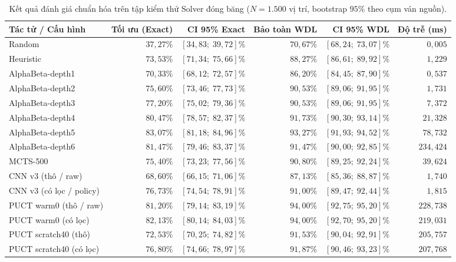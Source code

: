 \documentclass[11pt, a4paper]{article}
\begin{document}
\begin{table}[H]
    \centering
    \small
    \caption{Kết quả đánh giá chuẩn hóa trên tập kiểm thử Solver đóng băng ($N = 1.500$ vị trí, bootstrap $95\%$ theo cụm ván nguồn).}
    \label{tab:main_solver_eval}
    \begin{tabular}{@{} l r r r r r @{}}
        \toprule
        \textbf{Tác tử / Cấu hình} & \textbf{Tối ưu (Exact)} & \textbf{CI 95\% Exact} & \textbf{Bảo toàn WDL} & \textbf{CI 95\% WDL} & \textbf{Độ trễ (ms)} \\
        \midrule
        Random & $37{,}27\%$ & $[34{,}83;\; 39{,}72]\%$ & $70{,}67\%$ & $[68{,}24;\; 73{,}07]\%$ & $0{,}005$ \\
        Heuristic & $73{,}53\%$ & $[71{,}34;\; 75{,}66]\%$ & $88{,}27\%$ & $[86{,}61;\; 89{,}92]\%$ & $1{,}229$ \\
        AlphaBeta-depth1 & $70{,}33\%$ & $[68{,}12;\; 72{,}57]\%$ & $86{,}20\%$ & $[84{,}45;\; 87{,}90]\%$ & $0{,}537$ \\
        AlphaBeta-depth2 & $75{,}60\%$ & $[73{,}46;\; 77{,}73]\%$ & $90{,}53\%$ & $[89{,}06;\; 91{,}95]\%$ & $1{,}731$ \\
        AlphaBeta-depth3 & $77{,}20\%$ & $[75{,}02;\; 79{,}36]\%$ & $90{,}53\%$ & $[89{,}06;\; 91{,}95]\%$ & $7{,}372$ \\
        AlphaBeta-depth4 & $80{,}47\%$ & $[78{,}57;\; 82{,}37]\%$ & $91{,}73\%$ & $[90{,}30;\; 93{,}14]\%$ & $21{,}328$ \\
        AlphaBeta-depth5 & $83{,}07\%$ & $[81{,}18;\; 84{,}96]\%$ & $93{,}27\%$ & $[91{,}93;\; 94{,}52]\%$ & $78{,}732$ \\
        AlphaBeta-depth6 & $81{,}47\%$ & $[79{,}46;\; 83{,}37]\%$ & $91{,}47\%$ & $[90{,}00;\; 92{,}85]\%$ & $234{,}424$ \\
        MCTS-500 & $75{,}40\%$ & $[73{,}23;\; 77{,}56]\%$ & $90{,}80\%$ & $[89{,}25;\; 92{,}24]\%$ & $39{,}624$ \\
        \midrule
        CNN v3 (thô / raw) & $68{,}60\%$ & $[66{,}15;\; 71{,}06]\%$ & $87{,}13\%$ & $[85{,}36;\; 88{,}87]\%$ & $1{,}740$ \\
        CNN v3 (có lọc / policy) & $76{,}73\%$ & $[74{,}54;\; 78{,}91]\%$ & $91{,}00\%$ & $[89{,}47;\; 92{,}44]\%$ & $1{,}815$ \\
        PUCT warm0 (thô / raw) & $81{,}20\%$ & $[79{,}14;\; 83{,}19]\%$ & $94{,}00\%$ & $[92{,}75;\; 95{,}20]\%$ & $228{,}738$ \\
        PUCT warm0 (có lọc) & $82{,}13\%$ & $[80{,}14;\; 84{,}03]\%$ & $94{,}00\%$ & $[92{,}70;\; 95{,}20]\%$ & $219{,}031$ \\
        PUCT scratch40 (thô) & $72{,}53\%$ & $[70{,}25;\; 74{,}82]\%$ & $91{,}53\%$ & $[90{,}04;\; 92{,}91]\%$ & $205{,}757$ \\
        PUCT scratch40 (có lọc) & $76{,}80\%$ & $[74{,}66;\; 78{,}97]\%$ & $91{,}87\%$ & $[90{,}46;\; 93{,}23]\%$ & $207{,}768$ \\
        \bottomrule
    \end{tabular}
\end{table}
\end{document}
